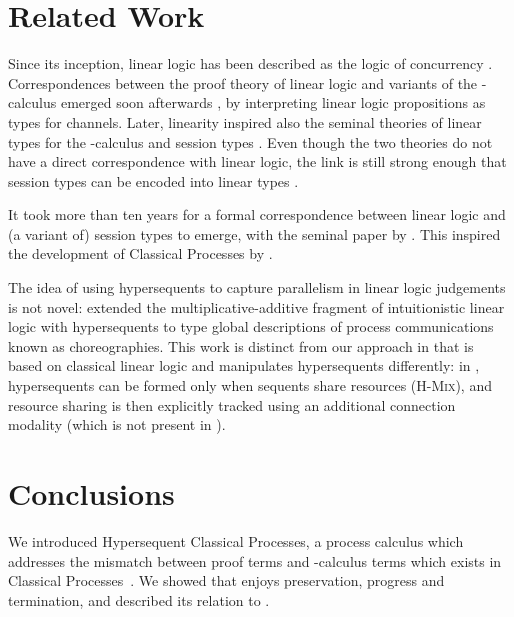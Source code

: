 \documentclass[draft,submission,copyright,creativecommons]{eptcs}
\begin{document}
\section{Related Work}
\label{sec:related-work}

Since its inception, linear logic has been described as the logic of concurrency \cite{girard1987}. Correspondences between the proof theory of linear logic and variants of the \textpi-calculus emerged soon afterwards \cite{abramsky1994,bellin1994}, by interpreting linear logic propositions as types for channels. Later, linearity inspired also the seminal theories of linear types for the \textpi-calculus \cite{kobayashi1999} and session types \cite{honda1998}. Even though the two theories do not have a direct correspondence with linear logic, the link is still strong enough that session types can be encoded into linear types \cite{dardha2017}.

It took more than ten years for a formal correspondence between linear logic and (a variant of) session types to emerge, with the seminal paper by \citet{caires2010}. This inspired the development of Classical Processes by \citet{wadler2012}.

The idea of using hypersequents to capture parallelism in linear logic judgements is not novel: \citet{carbone2018} extended the multiplicative-additive fragment of intuitionistic linear logic with hypersequents to type global descriptions of process communications known as choreographies. This work is distinct from our approach in that \hcp is based on classical linear logic and manipulates hypersequents differently: in \citet{carbone2018}, hypersequents can be formed only when sequents share resources (\cf \textsc{H-Mix}), and resource sharing is then explicitly tracked using an additional connection modality (which is not present in \hcp). 

\section{Conclusions}
\label{sec:conclusions}

We introduced Hypersequent Classical Processes, a process calculus which addresses the mismatch between proof terms and \textpi-calculus terms which exists in Classical Processes~\cite{wadler2012}. We showed that \hcp enjoys preservation, progress and termination, and described its relation to \cp.

\clearpage


\end{document}
